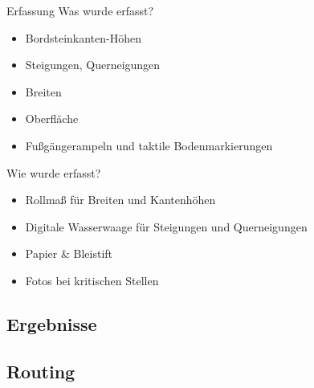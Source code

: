 \documentclass{beamer}
\begin{document}
\begin{frame}{Erfassung}
Was wurde erfasst?

    \begin{itemize}
      \item Bordsteinkanten-Höhen
      \item Steigungen, Querneigungen
      \item Breiten
      \item Oberfläche
      \item Fußgängerampeln und taktile Bodenmarkierungen
    \end{itemize}


Wie wurde erfasst?
    \begin{itemize}
      \item Rollmaß für Breiten und Kantenhöhen
      \item Digitale Wasserwaage für Steigungen und Querneigungen
      \item Papier \& Bleistift
      \item Fotos bei kritischen Stellen
    \end{itemize}

\end{frame}


\subsection{Ergebnisse}

\subsection{Routing}
\end{document}
